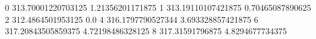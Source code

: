 0 313.70001220703125 1.21356201171875
1 313.19110107421875 0.70465087890625
2 312.4864501953125 0.0
4 316.1797790527344 3.693328857421875
6 317.20843505859375 4.72198486328125
8 317.31591796875 4.8294677734375
